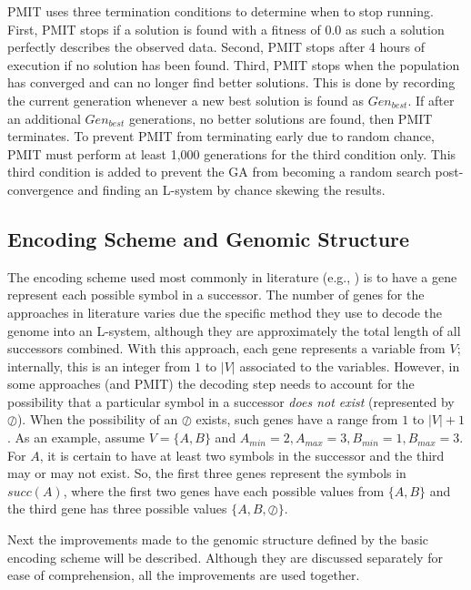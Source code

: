 \documentclass{llncs}
\begin{document}
	PMIT uses three termination conditions to determine when to stop running. First, PMIT stops if a solution is found with a fitness of 0.0 as such a solution perfectly describes the observed data. Second, PMIT stops after 4 hours of execution if no solution has been found. Third, PMIT stops when the population has converged and can no longer find better solutions. This is done by recording the current generation whenever a new best solution is found as $Gen_{best}$. If after an additional $Gen_{best}$ generations, no better solutions are found, then PMIT terminates. To prevent PMIT from terminating early due to random chance, PMIT must perform at least 1,000 generations for the third condition only. This third condition is added to prevent the GA from becoming a random search post-convergence and finding an L-system by chance skewing the results.
	
	\subsection{Encoding Scheme and Genomic Structure}
	
	The encoding scheme used most commonly in literature (e.g., \cite{runqiang_inferGA,mock_wildwood}) is to have a gene represent each possible symbol in a successor. The number of genes for the approaches in literature varies due the specific method they use to decode the genome into an L-system, although they are approximately the total length of all successors combined. With this approach, each gene represents a variable from $V$; internally, this is an integer from $1$ to $|V|$ associated to the variables. However, in some approaches (and PMIT) the decoding step needs to account for the possibility that a particular symbol in a successor \textit{does not exist} (represented by $\oslash$). When the possibility of an $\oslash$ exists, such genes have a range from $1$ to $|V|+1$. As an example, assume $V = \{A,B\}$ and $A_{min} = 2, A_{max} = 3, B_{min} = 1, B_{max} = 3$. For $A$, it is certain to have at least two symbols in the successor and the third may or may not exist. So, the first three genes represent the symbols in $succ(A)$, where the first two genes have each possible values from $\{A,B\}$ and the third gene has three possible values $\{A,B,\oslash\}$.
	
	Next the improvements made to the genomic structure defined by the basic encoding scheme will be described. Although they are discussed separately for ease of comprehension, all the improvements are used together.
	
\end{document}
